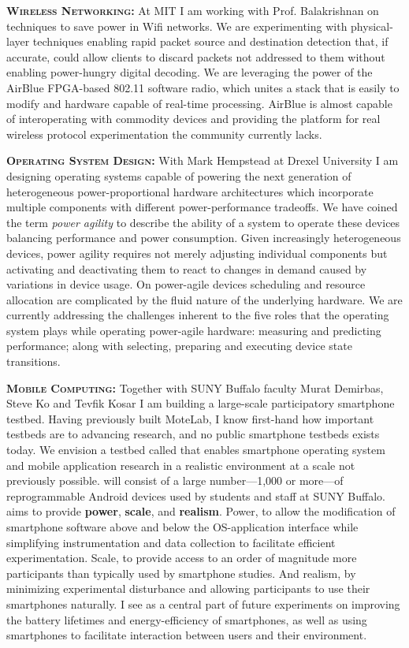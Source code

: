 \textbf{{\scshape Wireless Networking:}} At MIT I am working with Prof.
Balakrishnan on techniques to save power in Wifi networks. We are
experimenting with physical-layer techniques enabling rapid packet source and
destination detection that, if accurate, could allow clients to discard
packets not addressed to them without enabling power-hungry digital decoding.
We are leveraging the power of the AirBlue FPGA-based 802.11 software radio,
which unites a stack that is easily to modify and hardware capable of
real-time processing. AirBlue is almost capable of interoperating with
commodity devices and providing the platform for real
wireless protocol experimentation the community currently lacks.


\textbf{{\scshape Operating System Design:}} With Mark Hempstead at Drexel
University I am designing operating systems capable of powering the next
generation of heterogeneous power-proportional hardware architectures which
incorporate multiple components with different power-performance tradeoffs.
We have coined the term \textit{power agility} to describe the ability of a
system to operate these devices balancing performance and power consumption.
Given increasingly heterogeneous devices, power agility requires not merely
adjusting individual components but activating and deactivating them to react
to changes in demand caused by variations in device usage. On power-agile
devices scheduling and resource allocation are complicated by the fluid
nature of the underlying hardware. We are currently addressing the challenges
inherent to the five roles that the operating system plays while operating
power-agile hardware: measuring and predicting performance; along with
selecting, preparing and executing device state transitions.


\textbf{{\scshape Mobile Computing:}} Together with SUNY Buffalo faculty
Murat Demirbas, Steve Ko and Tevfik Kosar I am building a large-scale
participatory smartphone testbed. Having previously built MoteLab, I know
first-hand how important testbeds are to advancing research, and no public
smartphone testbeds exists today. We envision a testbed called \PhoneLab{}
that enables smartphone operating system and mobile application research in a
realistic environment at a scale not previously possible. \PhoneLab{} will
consist of a large number---1,000 or more---of reprogrammable Android devices
used by students and staff at SUNY Buffalo. \PhoneLab{} aims to provide
\textbf{power}, \textbf{scale}, and \textbf{realism}. Power, to allow the
modification of smartphone software above and below the OS-application
interface while simplifying instrumentation and data collection to facilitate
efficient experimentation. Scale, to provide access to an order of magnitude
more participants than typically used by smartphone studies. And realism, by
minimizing experimental disturbance and allowing participants to use their
smartphones naturally. I see \PhoneLab{} as a central part of future
experiments on improving the battery lifetimes and energy-efficiency of
smartphones, as well as using smartphones to facilitate interaction between
users and their environment.

